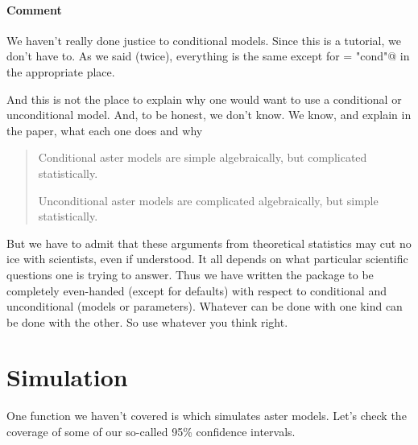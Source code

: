 \documentclass[11pt]{article}
\begin{document}
\paragraph{Comment} We haven't really done justice to conditional models.
Since this is a tutorial, we don't have to.  As we said (twice), everything
is the same except for \verb@type = "cond"@ in the appropriate place.

And this is not the place to explain why one would want to use a conditional
or unconditional model.  And, to be honest, we don't know.  We know, and
explain in the paper, what each one does and why
\begin{quote}
Conditional aster models are simple algebraically,
but complicated statistically.

Unconditional aster models are complicated algebraically,
but simple statistically.
\end{quote}

But we have to admit that these arguments from theoretical statistics
may cut no ice with scientists, even if understood.  It all depends
on what particular scientific questions one is trying to answer.
Thus we have written the \verb@aster@ package to be completely even-handed
(except for defaults) with respect to conditional and unconditional
(models or parameters).  Whatever can be done with one kind can be done
with the other.  So use whatever you think right.

\section{Simulation}

One function we haven't covered is \verb@raster@ which simulates aster
models.  Let's check the coverage of some of our
so-called 95\% confidence intervals.
\end{document}
